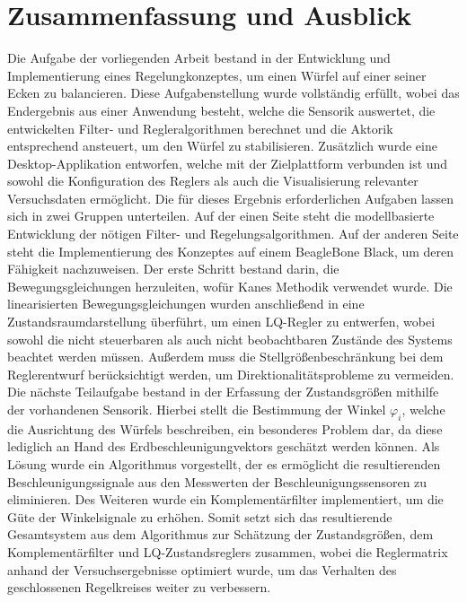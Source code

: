 \chapter{Zusammenfassung und Ausblick}
Die Aufgabe der vorliegenden Arbeit bestand in der Entwicklung und Implementierung eines Regelungkonzeptes, um einen Würfel auf einer seiner Ecken zu balancieren. Diese Aufgabenstellung wurde vollständig erfüllt, wobei das Endergebnis aus einer Anwendung besteht, welche die Sensorik auswertet, die entwickelten Filter- und Regleralgorithmen berechnet und die Aktorik entsprechend ansteuert, um den Würfel zu stabilisieren. Zusätzlich wurde eine Desktop-Applikation entworfen, welche mit der Zielplattform verbunden ist und sowohl die Konfiguration des Reglers als auch die Visualisierung relevanter Versuchsdaten ermöglicht. Die für dieses Ergebnis erforderlichen Aufgaben lassen sich in zwei Gruppen unterteilen. Auf der einen Seite steht die modellbasierte Entwicklung der nötigen Filter- und Regelungsalgorithmen. Auf der anderen Seite steht die Implementierung des Konzeptes auf einem BeagleBone Black, um deren Fähigkeit nachzuweisen.
Der erste Schritt bestand darin, die Bewegungsgleichungen herzuleiten, wofür Kanes Methodik verwendet wurde. Die linearisierten Bewegungsgleichungen wurden anschließend in eine Zustandsraumdarstellung überführt, um einen LQ-Regler zu entwerfen, wobei sowohl die nicht steuerbaren als auch nicht beobachtbaren Zustände des Systems beachtet werden müssen. Außerdem muss die Stellgrößenbeschränkung bei dem Reglerentwurf berücksichtigt werden, um Direktionalitätsprobleme zu vermeiden.
Die nächste Teilaufgabe bestand in der Erfassung der Zustandsgrößen mithilfe der vorhandenen Sensorik. Hierbei stellt die Bestimmung der Winkel $\varphi_i$, welche die Ausrichtung des Würfels beschreiben, ein besonderes Problem dar, da diese lediglich an Hand des Erdbeschleunigungvektors geschätzt werden können. Als Lösung wurde ein Algorithmus vorgestellt, der es ermöglicht die resultierenden Beschleunigungssignale aus den Messwerten der Beschleunigungssensoren zu eliminieren. Des Weiteren wurde ein Komplementärfilter implementiert, um die Güte der Winkelsignale zu erhöhen.
Somit setzt sich das resultierende Gesamtsystem aus dem Algorithmus zur Schätzung der Zustandsgrößen, dem Komplementärfilter und LQ-Zustandsreglers zusammen, wobei die Reglermatrix anhand der Versuchsergebnisse optimiert wurde, um das Verhalten des geschlossenen Regelkreises weiter zu verbessern.

